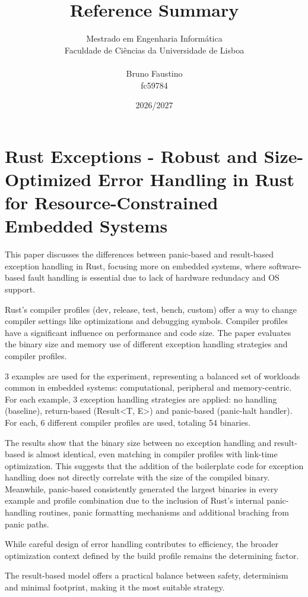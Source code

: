 \documentclass[a4paper,11pt]{article}
\title{\color{blue}
  Reference Summary}
\author{Mestrado em Engenharia Informática\\
  Faculdade de Ciências da Universidade de Lisboa\\ \\
  Bruno Faustino\\
  fc59784}
\date{2026/2027}
\theoremstyle{plain}
\theoremstyle{nonumberplain}
\begin{document}
\maketitle
\tableofcontents
\setlength{\parskip}{1ex}
\thispagestyle{empty}


\section{Rust Exceptions - Robust and Size-Optimized Error Handling in Rust for Resource-Constrained Embedded Systems}

This paper discusses the differences between panic-based and result-based exception handling in Rust, focusing more on embedded systems, where software-based fault handling is essential due to lack of hardware redundacy and OS support.

Rust's compiler profiles (dev, release, test, bench, custom) offer a way to change compiler settings like optimizations and debugging symbols. Compiler profiles have a significant influence on performance and code size. The paper evaluates the binary size and memory use of different exception handling strategies and compiler profiles.

3 examples are used for the experiment, representing a balanced set of workloads common in embedded systems: computational, peripheral and memory-centric. For each example, 3 exception handling strategies are applied: no handling (baseline), return-based (Result<T, E>) and panic-based (panic-halt handler). For each, 6 different compiler profiles are used, totaling 54 binaries.

The results show that the binary size between no exception handling and result-based is almost identical, even matching in compiler profiles with link-time optimization. This suggests that the addition of the boilerplate code for exception handling does not directly correlate with the size of the compiled binary. Meanwhile, panic-based consistently generated the largest binaries in every example and profile combination due to the inclusion of Rust's internal panic-handling routines, panic formatting mechanisms and additional braching from panic paths.

While careful design of error handling contributes to efficiency, the broader optimization context defined by the build profile remains the determining factor.

The result-based model offers a practical balance between safety, determinism and minimal footprint, making it the most suitable strategy.
\end{document}
